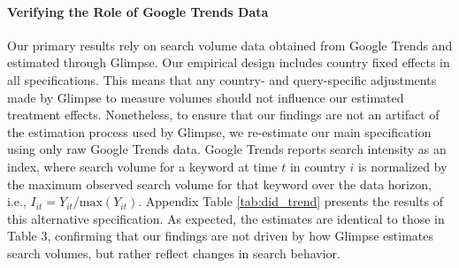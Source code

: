 \documentclass[11pt]{article}
\begin{document}
	\paragraph{Verifying the Role of Google Trends Data} Our primary results rely on search volume data obtained from Google Trends and estimated through Glimpse. Our empirical design includes country fixed effects in all specifications. This means that any country- and query-specific adjustments made by Glimpse to measure volumes should not influence our estimated treatment effects. Nonetheless, to ensure that our findings are not an artifact of the estimation process used by Glimpse, we re-estimate our main specification using only raw Google Trends data. Google Trends reports search intensity as an index, where search volume for a keyword at time $t$ in country $i$ is normalized by the maximum observed search volume for that keyword over the data horizon, i.e., $I_{it} = Y_{it} / \mathrm{max}(Y_{it})$. Appendix Table \ref{tab:did_trend} presents the results of this alternative specification. As expected, the estimates are identical to those in Table 3, confirming that our findings are not driven by how Glimpse estimates search volumes, but rather reflect changes in search behavior.
	
\end{document}
